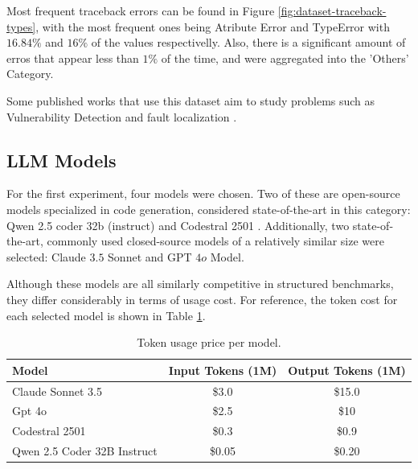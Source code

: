 Most frequent traceback errors can be found in Figure \ref{fig:dataset-traceback-types}, with the most frequent ones being Atribute Error and TypeError with $16.84\%$ and $16\%$ of the values respectivelly. Also, there is a significant amount of erros that appear less than $1\%$ of the time, and were aggregated into the 'Others' Category.

Some published works that use this dataset aim to study problems such as Vulnerability Detection \cite{zhao2024coding} and fault localization \cite{kulkarni2024graph}.

\subsection{LLM Models}
For the first experiment, four models were chosen. Two of these are open-source models specialized in code generation, considered state-of-the-art in this category: Qwen 2.5 coder 32b (instruct) \cite{hui2024qwen25codertechnicalreport} and Codestral 2501 \cite{Codestral_202501}. Additionally, two state-of-the-art, commonly used closed-source models of a relatively similar size were selected: Claude $3.5$ Sonnet and GPT $4o$ Model.

Although these models are all similarly competitive in structured benchmarks, they differ considerably in terms of usage cost. For reference, the token cost for each selected model is shown in Table \ref{tab:model-tokens}.
\begin{table}[h!]
\centering
\caption{Token usage price per model.}
\label{tab:model-tokens}
\begin{tabular}{|l|c|c|}
\hline
\textbf{Model} & \textbf{Input Tokens (1M)} & \textbf{Output Tokens (1M)} \\ \hline
Claude Sonnet 3.5 & \$3.0 & \$15.0 \\ \hline
Gpt 4o & \$2.5 & \$10 \\ \hline
Codestral 2501 & \$0.3 & \$0.9 \\ \hline
Qwen 2.5 Coder 32B Instruct & \$0.05 & \$0.20 \\ \hline
\end{tabular}
\end{table}

